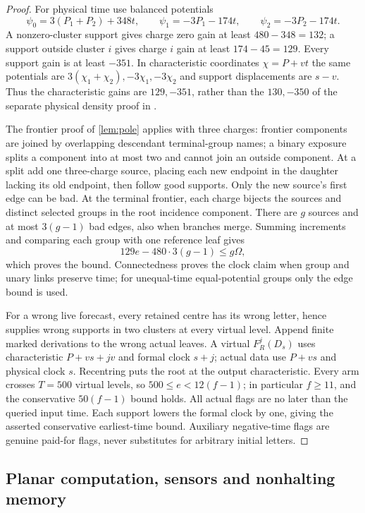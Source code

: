 \begin{proof}
For physical time use balanced potentials
\[
 \psi_0=3(P_1+P_2)+348t,\qquad
 \psi_1=-3P_1-174t,\qquad\psi_2=-3P_2-174t.
\]
A nonzero-cluster support gives charge zero gain at least $480-348=132$; a support outside cluster $i$ gives charge $i$ gain at least $174-45=129$. Every support gain is at least $-351$. In characteristic coordinates $\chi=P+vt$ the same potentials are $3(\chi_1+\chi_2),-3\chi_1,-3\chi_2$ and support displacements are $s-v$. Thus the characteristic gains are $129,-351$, rather than the $130,-350$ of the separate physical density proof in \cite[Lemma~12.3]{DMforgetLower}.

The frontier proof of \cref{lem:pole} applies with three charges: frontier components are joined by overlapping descendant terminal-group names; a binary exposure splits a component into at most two and cannot join an outside component. At a split add one three-charge source, placing each new endpoint in the daughter lacking its old endpoint, then follow good supports. Only the new source's first edge can be bad. At the terminal frontier, each charge bijects the sources and distinct selected groups in the root incidence component. There are $g$ sources and at most $3(g-1)$ bad edges, also when branches merge. Summing increments and comparing each group with one reference leaf gives
\[
 129e-480\cdot3(g-1)\le g\Omega,
\]
which proves the bound. Connectedness proves the clock claim when group and unary links preserve time; for unequal-time equal-potential groups only the edge bound is used.

For a wrong live forecast, every retained centre has its wrong letter, hence supplies wrong supports in two clusters at every virtual level. Append finite marked derivations to the wrong actual leaves. A virtual $F_R^j(D_s)$ uses characteristic $P+vs+jv$ and formal clock $s+j$; actual data use $P+vs$ and physical clock $s$. Recentring puts the root at the output characteristic. Every arm crosses $T=500$ virtual levels, so $500\le e<12(f-1)$; in particular $f\ge11$, and the conservative $50(f-1)$ bound holds. All actual flags are no later than the queried input time. Each support lowers the formal clock by one, giving the asserted conservative earliest-time bound. Auxiliary negative-time flags are genuine paid-for flags, never substitutes for arbitrary initial letters.
\end{proof}

\subsection{Planar computation, sensors and nonhalting memory}


